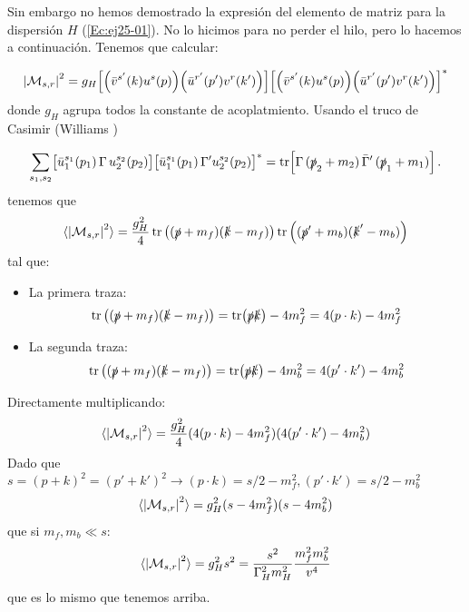 Sin embargo no hemos demostrado la expresión del elemento de matriz para  la dispersión $H$ (\ref{Ec:ej25-01}). No lo hicimos para no perder el hilo, pero lo hacemos a continuación. Tenemos que calcular:  

\begin{equation}
	\vqty{\Mcal_{s,r}}^2 = g_H \bqty{\pqty{\bar{v}^{s'}(k) u^{s}(p)}\pqty{\bar{u}^{r'}(p') v^{r}(k')}} \bqty{\pqty{\bar{v}^{s'}(k) u^{s}(p)}\pqty{\bar{u}^{r'}(p')v^{r}(k')}}^*
\end{equation}
donde $g_H$ agrupa todos la constante de acoplatmiento. Usando el truco de Casimir (Williams \cite{Williams_2022})

\[
	\sum_{s_1,s_2}
	\bigl[\bar{u}_1^{s_1}(p_1)\,\Gamma\,u_2^{s_2}(p_2)\bigr]
	\bigl[\bar{u}_1^{s_1}(p_1)\,\Gamma' u_2^{s_2}(p_2)\bigr]^*
	= \mathrm{tr}\!\left[ \Gamma \,(\slashed{p}_2+m_2)\,\bar{\Gamma}'\,(\slashed{p}_1+m_1) \right].
\]
tenemos que
\begin{equation}
	\langle \vqty{\Mcal_{s,r}}^2 \rangle = \frac{g_H^2}{4} \tr \pqty{(\pslash+m_f)(\kslash-m_f)}\tr \pqty{(\pslash'+m_b)(\kslash'-m_b)}
\end{equation}
tal que:

\begin{itemize}
	\item La primera traza:
	      \begin{equation}
		      \tr \pqty{ (\pslash+m_f) (\kslash-m_f)} = \tr ( \pslash \kslash) - 4m_f^2  = 4(p \cdot k) - 4m_f^2
	      \end{equation}
	\item La segunda traza:
	      \begin{equation}
		      \tr \pqty{ (\pslash+m_f) (\kslash-m_f)} = \tr ( \pslash \kslash) - 4m_b^2  = 4(p' \cdot k') - 4m_b^2
	      \end{equation}
\end{itemize}
Directamente  multiplicando:
\begin{equation}
	\langle \vqty{\Mcal_{s,r}}^2 \rangle = \frac{g_H^2}{4}(4(p \cdot k) - 4m_f^2)(4(p' \cdot k') - 4m_b^2)
\end{equation}
Dado que $s=(p+k)^2 = (p'+k')^2 \to (p\cdot k) =  s/2 - m_f^2 , (p'\cdot k') =  s/2 - m_b^2$
\begin{equation}
	\langle \vqty{\Mcal_{s,r}}^2 \rangle = g_H^2 (s-4m_f^2)(s-4m_b^2) 
\end{equation}
que si $m_f,m_b\ll s $: 
\begin{equation}
	\langle \vqty{\Mcal_{s,r}}^2 \rangle = g_H^2 s^2 = \frac{s^2}{\Gamma_H^2 m_H^2}\frac{m_f^2m_b^2}{v^4}
\end{equation}
que es lo mismo que tenemos arriba. 